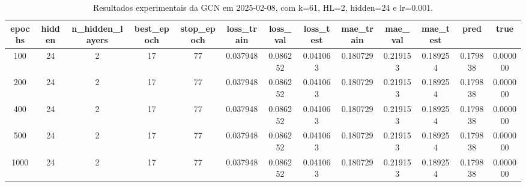 \begin{table}[h]
\centering
\caption{Resultados experimentais da GCN em 2025-02-08, com k=61, HL=2, hidden=24 e lr=0.001.}
\label{tab:gcn_results_k61_hl2_h24_d20250208}
\begin{tabular}{ccccccccccccc}
\toprule
epochs & hidden & n\_hidden\_layers & best\_epoch & stop\_epoch & loss\_train & loss\_val & loss\_test & mae\_train & mae\_val & mae\_test & pred & true \\
\midrule
100 & 24 & 2 & 17 & 77 & 0.037948 & 0.086252 & 0.041063 & 0.180729 & 0.219153 & 0.189254 & 0.179838 & 0.000000 \\
200 & 24 & 2 & 17 & 77 & 0.037948 & 0.086252 & 0.041063 & 0.180729 & 0.219153 & 0.189254 & 0.179838 & 0.000000 \\
400 & 24 & 2 & 17 & 77 & 0.037948 & 0.086252 & 0.041063 & 0.180729 & 0.219153 & 0.189254 & 0.179838 & 0.000000 \\
500 & 24 & 2 & 17 & 77 & 0.037948 & 0.086252 & 0.041063 & 0.180729 & 0.219153 & 0.189254 & 0.179838 & 0.000000 \\
1000 & 24 & 2 & 17 & 77 & 0.037948 & 0.086252 & 0.041063 & 0.180729 & 0.219153 & 0.189254 & 0.179838 & 0.000000 \\
\bottomrule
\end{tabular}
\end{table}
